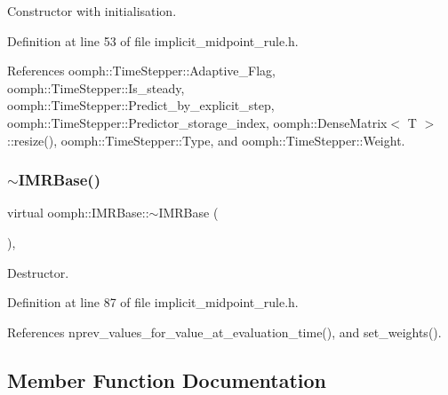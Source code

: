Constructor with initialisation. 



Definition at line 53 of file implicit\+\_\+midpoint\+\_\+rule.\+h.



References oomph\+::\+Time\+Stepper\+::\+Adaptive\+\_\+\+Flag, oomph\+::\+Time\+Stepper\+::\+Is\+\_\+steady, oomph\+::\+Time\+Stepper\+::\+Predict\+\_\+by\+\_\+explicit\+\_\+step, oomph\+::\+Time\+Stepper\+::\+Predictor\+\_\+storage\+\_\+index, oomph\+::\+Dense\+Matrix$<$ T $>$\+::resize(), oomph\+::\+Time\+Stepper\+::\+Type, and oomph\+::\+Time\+Stepper\+::\+Weight.

\mbox{\label{classoomph_1_1IMRBase_a0d42ce83608fef0367c421b7c4cfeadf}} 
\subsubsection{\texorpdfstring{$\sim$\+I\+M\+R\+Base()}{~IMRBase()}}
{\footnotesize\ttfamily virtual oomph\+::\+I\+M\+R\+Base\+::$\sim$\+I\+M\+R\+Base (\begin{DoxyParamCaption}{ }\end{DoxyParamCaption})\hspace{0.3cm}{\ttfamily [inline]}, {\ttfamily [virtual]}}



Destructor. 



Definition at line 87 of file implicit\+\_\+midpoint\+\_\+rule.\+h.



References nprev\+\_\+values\+\_\+for\+\_\+value\+\_\+at\+\_\+evaluation\+\_\+time(), and set\+\_\+weights().



\subsection{Member Function Documentation}
\mbox{\label{classoomph_1_1IMRBase_ae9c3433ed870a32d2f94f7aa7b39104e}} 
